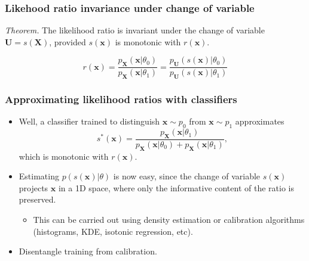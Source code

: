 \documentclass{beamer}
\begin{document}
\begin{frame}
    \frametitle{Likehood ratio invariance under change of variable}

    {\it Theorem.} The likelihood ratio is invariant under the change of variable $\mathbf{U} = s(\mathbf{X})$, provided $s(\mathbf{x})$ is monotonic with $r(\mathbf{x})$.

    $$
    r(\mathbf{x}) = \frac{ p_\mathbf{X}(\mathbf{x}|\theta_0)}{ p_\mathbf{X}(\mathbf{x}|\theta_1)} = \frac{ p_\mathbf{U}(s(\mathbf{x})|\theta_0)}{ p_\mathbf{U}(s(\mathbf{x})|\theta_1)}
    $$
\end{frame}

\begin{frame}
    \frametitle{Approximating likelihood ratios with classifiers}

    \begin{itemize}
        \item Well, a classifier trained to distinguish $\mathbf{x} \sim p_0$ from $\mathbf{x} \sim p_1$ approximates $$s^*(\mathbf{x}) = \frac{p_\mathbf{X}(\mathbf{x}|\theta_1)}{p_\mathbf{X}(\mathbf{x}|\theta_0) + p_\mathbf{X}(\mathbf{x}|\theta_1)},$$ which is monotonic with $r(\mathbf{x})$.

        \item Estimating $p(s(\mathbf{x})|\theta)$ is now easy, since the change of variable $s(\mathbf{x})$ projects $\mathbf{x}$ in a 1D space, where only the informative content of the ratio is preserved.

        \begin{itemize}
            \item This can be carried out using density estimation or calibration algorithms (histograms, KDE, isotonic regression, etc).
        \end{itemize}

        \item Disentangle training from calibration.
    \end{itemize}
\end{frame}
\end{document}
